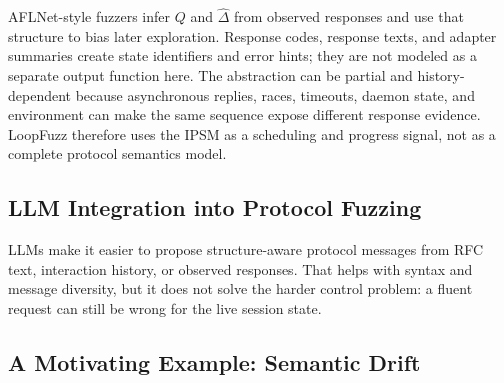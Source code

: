 \documentclass[final,5p,times,number]{elsarticle}
\begin{document}
AFLNet-style fuzzers infer $Q$ and $\widehat{\Delta}$ from observed responses and use that structure to bias later exploration. Response codes, response texts, and adapter summaries create state identifiers and error hints; they are not modeled as a separate output function here. The abstraction can be partial and history-dependent because asynchronous replies, races, timeouts, daemon state, and environment can make the same sequence expose different response evidence. LoopFuzz therefore uses the IPSM as a scheduling and progress signal, not as a complete protocol semantics model.

\subsection{LLM Integration into Protocol Fuzzing}
LLMs make it easier to propose structure-aware protocol messages from RFC text, interaction history, or observed responses. That helps with syntax and message diversity, but it does not solve the harder control problem: a fluent request can still be wrong for the live session state.

\subsection{A Motivating Example: Semantic Drift}
\end{document}
